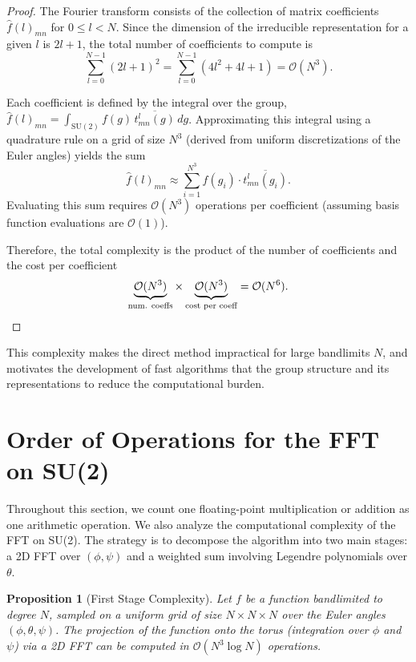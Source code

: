 \documentclass[11pt]{article}
\newtheorem{prop}[thm]{Proposition}
\theoremstyle{definition}
\theoremstyle{remark}
\numberwithin{equation}{section}
\begin{document}
\begin{proof}
The Fourier transform consists of the collection of matrix coefficients $\hat{f}(l)_{mn}$ for $0 \leq l < N$. Since the dimension of the irreducible representation for a given $l$ is $2l+1$, the total number of coefficients to compute is
\begin{equation}
    \sum_{l=0}^{N-1} (2l+1)^2 = \sum_{l=0}^{N-1} (4l^2 + 4l + 1) = \mathcal{O}(N^3).
\end{equation}

Each coefficient is defined by the integral over the group, $\hat{f}(l)_{mn} = \int_{\mathrm{SU}(2)} f(g) \, \overline{t^l_{mn}(g)} \, dg$. Approximating this integral using a quadrature rule on a grid of size $N^3$ (derived from uniform discretizations of the Euler angles) yields the sum
\begin{equation}
    \hat{f}(l)_{mn} \approx \sum_{i=1}^{N^3} f(g_i) \cdot \overline{t^l_{mn}(g_i)}.
\end{equation}
Evaluating this sum requires $\mathcal{O}(N^3)$ operations per coefficient (assuming basis function evaluations are $\mathcal{O}(1)$).

Therefore, the total complexity is the product of the number of coefficients and the cost per coefficient
\begin{equation*}
    \underbrace{\mathcal{O}(N^3)}_{\text{num. coeffs}} \times \underbrace{\mathcal{O}(N^3)}_{\text{cost per coeff}} = \mathcal{O}(N^6). \qedhere
\end{equation*}
\end{proof}

This complexity makes the direct method impractical for large bandlimits $N$, and motivates the development of fast algorithms that the group structure and its representations to reduce the computational burden.



\section{Order of Operations for the FFT on SU(2)}\label{sec:order-fftsu2}


Throughout this section, we count one floating-point multiplication or addition as one arithmetic operation. We also analyze the computational complexity of the FFT on SU(2). The strategy is to decompose the algorithm into two main stages: a 2D FFT over $(\phi, \psi)$ and a weighted sum involving Legendre polynomials over $\theta$.

\begin{prop}[First Stage Complexity]\label{P_1}
Let $f$ be a function bandlimited to degree $N$, sampled on a uniform grid of size $N \times N \times N$ over the Euler angles $(\phi, \theta, \psi)$. The projection of the function onto the torus (integration over $\phi$ and $\psi$) via a 2D FFT can be computed in $\mathcal{O}(N^3 \log N)$ operations.
\end{prop}
\end{document}
